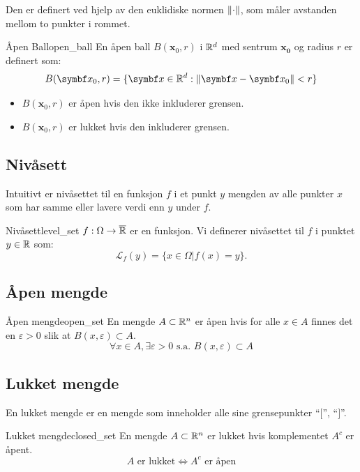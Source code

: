 Den er definert ved hjelp av den euklidiske normen \(\lVert\cdot\rVert\), som måler avstanden mellom to punkter i rommet.

\begin{definition}{Åpen Ball}{open_ball}
	En åpen ball \(B(\mathbf{x}_0, r)\) i \(\mathbb{R}^d\) med sentrum \(\mathbf{x_0}\) og radius \(r\) er definert som:
	\[
		B(\mathbf{x}_0, r) = \{ \mathbf{x} \in \R^d : \norm{\mathbf{x} - \mathbf{x}_0} < r\}
	\]
	\begin{itemize}
		\item \(B(\mathbf{x}_0, r)\) er åpen hvis den ikke inkluderer grensen.
		\item \(B(\mathbf{x}_0, r)\) er lukket hvis den inkluderer grensen.
	\end{itemize}
\end{definition}

\subsection{Nivåsett}
Intuitivt er nivåsettet til en funksjon \( f \) i et punkt \( y \) mengden av alle punkter \( x \) som har samme eller lavere verdi enn \( y \) under \( f \).
\begin{definition}{Nivåsett}{level_set}
	\(f: \Omega \to \overline{\mathbb{R}}\) er en funksjon. Vi definerer nivåsettet til \(f\) i punktet \(y \in \mathbb{R}\) som:
	\[
		\mathcal{L}_f(y) = \{x \in \Omega | f(x) = y\}.
	\]
\end{definition}

\subsection{Åpen mengde}

\begin{definition}{Åpen mengde}{open_set}
	En mengde \(A \subset \mathbb{R}^n\) er åpen hvis for alle \(x \in A\) finnes det en \(\varepsilon > 0\) slik at \(B(x, \varepsilon) \subset A\).
	\[
		\forall x \in A, \exists \varepsilon > 0 \text{ s.a. } B(x, \varepsilon) \subset A
	\]
\end{definition}

\subsection{Lukket mengde}
En lukket mengde er en mengde som inneholder alle sine grensepunkter \enquote{$[$}, \enquote{$]$}.
\begin{definition}{Lukket mengde}{closed_set}
	En mengde \(A \subset \mathbb{R}^n\) er lukket hvis komplementet \(A^c\) er åpent.
	\[
		A \text{ er lukket} \Leftrightarrow A^c \text{ er åpen}
	\]
\end{definition}

